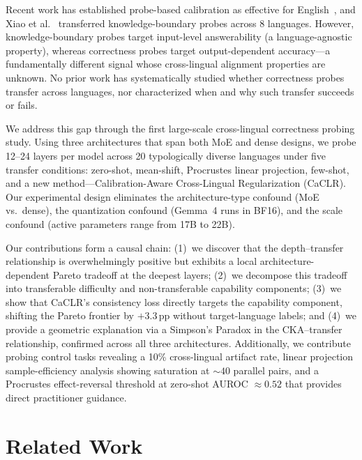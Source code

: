\documentclass[11pt,a4paper]{article}
\newcommand{\pp}{\,\text{pp}}
\newcommand{\caclr}{CaCLR}
\begin{document}
Recent work has established probe-based calibration as effective for English~\cite{miao2026coral,ji2024confidence}, and Xiao et al.~\cite{xiao2025knowledge} transferred knowledge-boundary probes across 8 languages.
However, knowledge-boundary probes target input-level answerability (a language-agnostic property), whereas correctness probes target output-dependent accuracy---a fundamentally different signal whose cross-lingual alignment properties are unknown.
No prior work has systematically studied whether correctness probes transfer across languages, nor characterized when and why such transfer succeeds or fails.

We address this gap through the first large-scale cross-lingual correctness probing study.
Using three architectures that span both MoE and dense designs, we probe 12--24 layers per model across 20 typologically diverse languages under five transfer conditions: zero-shot, mean-shift, Procrustes linear projection, few-shot, and a new method---Calibration-Aware Cross-Lingual Regularization (\caclr{}).
Our experimental design eliminates the architecture-type confound (MoE vs.\ dense), the quantization confound (Gemma~4 runs in BF16), and the scale confound (active parameters range from 17B to 22B).

Our contributions form a causal chain: (1)~we discover that the depth--transfer relationship is overwhelmingly positive but exhibits a local architecture-dependent Pareto tradeoff at the deepest layers; (2)~we decompose this tradeoff into transferable difficulty and non-transferable capability components; (3)~we show that \caclr{}'s consistency loss directly targets the capability component, shifting the Pareto frontier by $+3.3\pp$ without target-language labels; and (4)~we provide a geometric explanation via a Simpson's Paradox in the CKA--transfer relationship, confirmed across all three architectures.
Additionally, we contribute probing control tasks revealing a 10\% cross-lingual artifact rate, linear projection sample-efficiency analysis showing saturation at ${\sim}40$ parallel pairs, and a Procrustes effect-reversal threshold at zero-shot AUROC ${\approx}0.52$ that provides direct practitioner guidance.


\section{Related Work}
\end{document}
